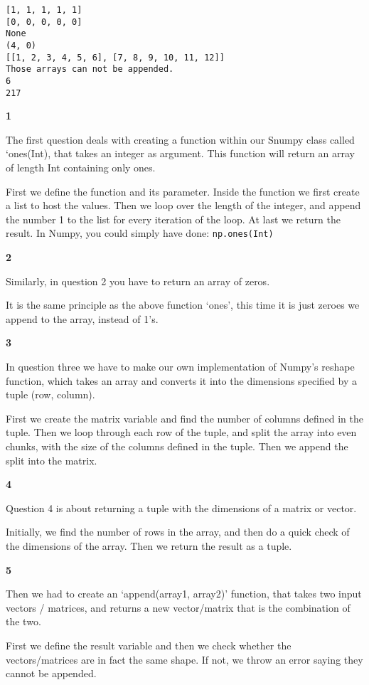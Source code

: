 \documentclass[11pt]{article}
\begin{document}
    \begin{Verbatim}[commandchars=\\\{\}]
[1, 1, 1, 1, 1]
[0, 0, 0, 0, 0]
None
(4, 0)
[[1, 2, 3, 4, 5, 6], [7, 8, 9, 10, 11, 12]]
Those arrays can not be appended.
6
217

    \end{Verbatim}

    \textbf{1}

The first question deals with creating a function within our Snumpy
class called `ones(Int), that takes an integer as argument. This
function will return an array of length Int containing only ones.

First we define the function and its parameter. Inside the function we
first create a list to host the values. Then we loop over the length of
the integer, and append the number 1 to the list for every iteration of
the loop. At last we return the result. In Numpy, you could simply have
done: \texttt{np.ones(Int)}

    \textbf{2}

Similarly, in question 2 you have to return an array of zeros.

It is the same principle as the above function `ones', this time it is
just zeroes we append to the array, instead of 1's.

    \textbf{3}

In question three we have to make our own implementation of Numpy's
reshape function, which takes an array and converts it into the
dimensions specified by a tuple (row, column).

First we create the matrix variable and find the number of columns
defined in the tuple. Then we loop through each row of the tuple, and
split the array into even chunks, with the size of the columns defined
in the tuple. Then we append the split into the matrix.

    \textbf{4}

Question 4 is about returning a tuple with the dimensions of a matrix or
vector.

Initially, we find the number of rows in the array, and then do a quick
check of the dimensions of the array. Then we return the result as a
tuple.

    \textbf{5}

Then we had to create an `append(array1, array2)' function, that takes
two input vectors / matrices, and returns a new vector/matrix that is
the combination of the two.

First we define the result variable and then we check whether the
vectors/matrices are in fact the same shape. If not, we throw an error
saying they cannot be appended.
\end{document}

